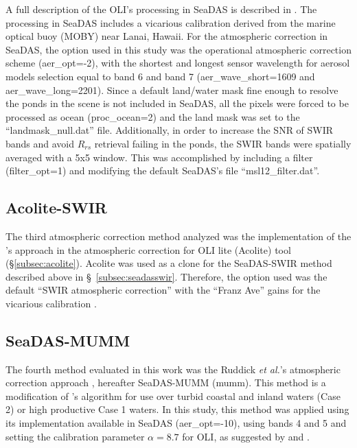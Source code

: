 A full description of the OLI's processing in SeaDAS is described in \cite{Franz:2015}. The processing in SeaDAS includes a vicarious calibration derived from the marine optical buoy (MOBY) near Lanai, Hawaii. For the atmospheric correction in SeaDAS, the option used in this study was the operational atmospheric correction scheme (aer\_opt=-2), with the shortest and longest sensor wavelength for aerosol models selection equal to band 6 and band 7 (aer\_wave\_short=1609 and aer\_wave\_long=2201). Since a default land/water mask fine enough to resolve the ponds in the scene is not included in SeaDAS, all the pixels were forced to be processed as ocean (proc\_ocean=2) and the land mask was set to the ``landmask\_null.dat'' file. Additionally, in order to increase the SNR of SWIR bands and avoid $R_{rs}$ retrieval failing in the ponds, the SWIR bands were spatially averaged with a 5x5 window. This was accomplished by including a filter (filter\_opt=1) and modifying the default SeaDAS's file ``msl12\_filter.dat''.
\subsection{Acolite-SWIR}
The third atmospheric correction method analyzed was the implementation of the \cite{Gordon:1994}'s approach in the atmospheric correction for OLI lite (Acolite) tool (\S\ref{subsec:acolite}). Acolite was used as a clone for the SeaDAS-SWIR method described above in \S~\ref{subsec:seadasswir}. Therefore, the option used was the default ``SWIR atmospheric correction'' with the ``Franz Ave'' gains for the vicarious calibration \cite{Franz:2015}.
\subsection{SeaDAS-MUMM}
The fourth method evaluated in this work was the Ruddick {\it et al.}'s atmospheric correction approach \cite{Ruddick:2000bs}, hereafter SeaDAS-MUMM (\acrfull{mumm}). This method is a modification of \cite{Gordon:1994}'s algorithm for use over turbid coastal and inland waters (Case 2) or high productive Case 1 waters. In this study, this method was applied using its implementation available in SeaDAS (aer\_opt=-10), using bands 4 and 5 and setting the calibration parameter $\alpha=8.7$ for OLI, as suggested by \cite{Vanhellemont2014} and \cite{Vanhellemont2014a}. 

